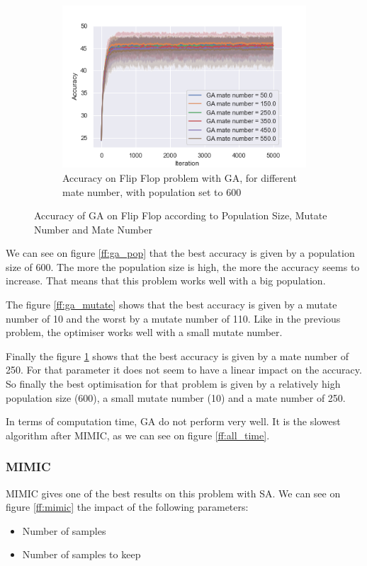 \documentclass[10pt]{article}
\begin{document}
\begin{figure}[h]
\begin{subfigure}[t]{0.32\columnwidth}
						\centering
						\includegraphics[width=\linewidth]{../graphics/flip_flop_GA_Iteration_Error_GA_mate_number.png}
						\caption{Accuracy on Flip Flop problem with GA, for different mate number, with population set to 600}
						\label{ff:ga_mate}
					\end{subfigure}
					\caption{Accuracy of GA on Flip Flop according to Population Size, Mutate Number and Mate Number}
					\label{ff:ga}
				\end{figure}

				We can see on figure \ref{ff:ga_pop} that the best accuracy is given by a population size of 600. The more the population size is high, the more the accuracy seems to increase. That means that this problem works well with a big population.

				The figure \ref{ff:ga_mutate} shows that the best accuracy is given by a mutate number of 10 and the worst by a mutate number of 110. Like in the previous problem, the optimiser works well with a small mutate number.

				Finally the figure \ref{ff:ga_mate} shows that the best accuracy is given by a mate number of 250. For that parameter it does not seem to have a linear impact on the accuracy. So finally the best optimisation for that problem is given by a relatively high population size (600), a small mutate number (10) and a mate number of 250.

				In terms of computation time, GA do not perform very well. It is the slowest algorithm after MIMIC, as we can see on figure \ref{ff:all_time}.
			\subsubsection*{MIMIC}
				MIMIC gives one of the best results on this problem with SA. We can see on figure \ref{ff:mimic} the impact of the following parameters:
				\begin{itemize}
					\item Number of samples
					\item Number of samples to keep
				\end{itemize}
\end{document}
